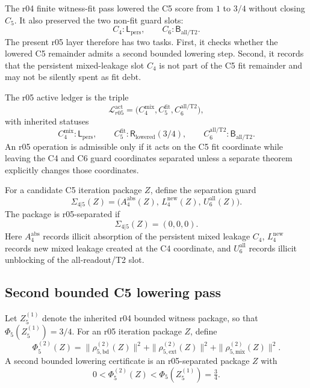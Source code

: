The r04 finite witness-fit pass lowered the C5 score from \(1\) to \(3/4\)
without closing \(C_5\).  It also preserved the two non-fit guard slots:
\[
C_4:\mathsf L_{\mathrm{pers}},\qquad
C_6:\mathsf B_{\mathrm{all/T2}}.
\]
The present r05 layer therefore has two tasks.  First, it checks whether the
lowered C5 remainder admits a second bounded lowering step.  Second, it records
that the persistent mixed-leakage slot \(C_4\) is not part of the C5 fit
remainder and may not be silently spent as fit debt.

\begin{definition}
\label{def:v470-r05-separated-active-ledger}
The r05 active ledger is the triple
\[
\mathcal L_{r05}^{\mathrm{act}}
=
\bigl(C_4^{\mathrm{mix}},C_5^{\mathrm{fit}},C_6^{\mathrm{all/T2}}\bigr),
\]
with inherited statuses
\[
C_4^{\mathrm{mix}}:\mathsf L_{\mathrm{pers}},\qquad
C_5^{\mathrm{fit}}:\mathsf R_{\mathrm{lowered}}(3/4),\qquad
C_6^{\mathrm{all/T2}}:\mathsf B_{\mathrm{all/T2}}.
\]
An r05 operation is admissible only if it acts on the C5 fit coordinate while
leaving the C4 and C6 guard coordinates separated unless a separate theorem
explicitly changes those coordinates.
\end{definition}

\begin{definition}
\label{def:v470-r05-separation-guard}
For a candidate C5 iteration package \(Z\), define the separation guard
\[
\Sigma_{4|5}(Z)
=
\bigl(A_4^{\mathrm{abs}}(Z),\,L_4^{\mathrm{new}}(Z),\,U_6^{\mathrm{all}}(Z)\bigr).
\]
The package is r05-separated if
\[
\Sigma_{4|5}(Z)=(0,0,0).
\]
Here \(A_4^{\mathrm{abs}}\) records illicit absorption of the persistent mixed
leakage \(C_4\), \(L_4^{\mathrm{new}}\) records new mixed leakage created at the
C4 coordinate, and \(U_6^{\mathrm{all}}\) records illicit unblocking of the
all-readout/T2 slot.
\end{definition}

\subsection{Second bounded C5 lowering pass}
\label{subsec:v470-r05-second-bounded-c5-lowering}

\begin{definition}
\label{def:v470-r05-iterated-c5-score}
Let \(Z_5^{(1)}\) denote the inherited r04 bounded witness package, so that
\(\Phi_5(Z_5^{(1)})=3/4\).  For an r05 iteration package \(Z\), define
\[
\Phi_5^{(2)}(Z)
=
\|\rho_{5,\mathrm{bd}}^{(2)}(Z)\|^2
+
\|\rho_{5,\mathrm{ext}}^{(2)}(Z)\|^2
+
\|\rho_{5,\mathrm{mix}}^{(2)}(Z)\|^2.
\]
A second bounded lowering certificate is an r05-separated package \(Z\) with
\[
0<\Phi_5^{(2)}(Z)<\Phi_5(Z_5^{(1)})=\tfrac34.
\]
\end{definition}

